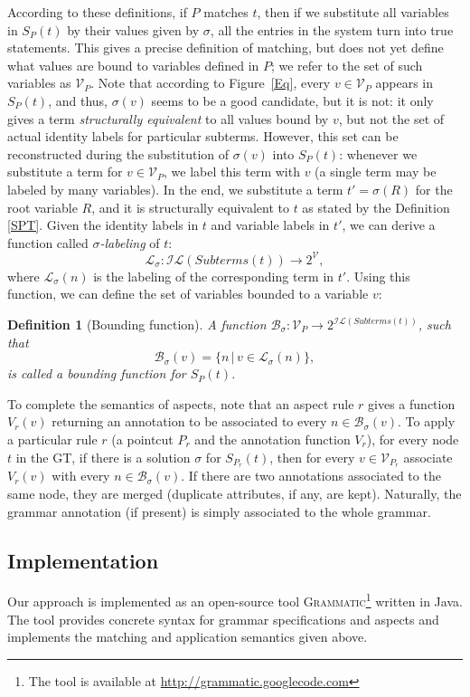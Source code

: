 \documentclass{IOS-Book-Article}     %
\newtheorem{Def}{Definition}
\newcommand{\figref}[1]{Figure~\ref{#1}}
\newcommand{\tool}[1]{\textsc{#1}}
\newcommand{\Grammatic}[0]{\tool{Grammatic}}
\begin{document}
According to these definitions, if $P$ matches $t$, then if we substitute all variables in $S_P(t)$ by their values given by $\sigma$, all the entries in the system turn into true statements. This gives a precise definition of matching, but does not yet define what values are bound to variables defined in $P$; we refer to the set of such variables as $\mathcal{V}_P$. Note that according to \figref{Eq}, every $v \in \mathcal{V}_P$ appears in $S_P(t)$, and thus, $\sigma(v)$ seems to be a good candidate, but it is not: it only gives a term \emph{structurally equivalent} to all values bound by $v$, but not the set of actual identity labels for particular subterms. However, this set can be reconstructed during the substitution of $\sigma(v)$ into $S_P(t)$: whenever we substitute a term for $v \in \mathcal{V}_P$, we label this term with $v$ (a single term may be labeled by many variables). In the end, we substitute a term $t' = \sigma(R)$ for the root variable $R$, and it is structurally equivalent to $t$ as stated by the Definition \ref{SPT}. Given the identity labels in $t$ and variable labels in $t'$, we can derive a function called \emph{$\sigma$-labeling} of $t$:
$$\mathcal{L}_\sigma : \mathcal{IL}(Subterms(t)) \rightarrow 2^{\mathcal{V}},$$
where $\mathcal{L}_\sigma(n)$ is the labeling of the corresponding term in $t'$. Using this function, we can define the set of variables bounded to a variable $v$:
\begin{Def}[Bounding function]
A function $\mathcal{B}_\sigma : \mathcal{V}_P \rightarrow 2^{\mathcal{IL}(Subterms(t))}$, such that $$\mathcal{B}_\sigma(v) = \{n \,|\, v \in \mathcal{L}_\sigma(n)\},$$
is called a \emph{bounding function} for $S_P(t)$.
\end{Def}

To complete the semantics of aspects, note that an aspect rule $r$ gives a function $V_r(v)$ returning an annotation to be associated to every $n \in \mathcal{B}_\sigma(v)$. To apply a particular rule $r$ (a pointcut $P_r$ and the annotation function $V_r$), for every node $t$ in the GT, if there is a solution $\sigma$ for $S_{P_r}(t)$, then for every $v \in \mathcal{V}_{P_r}$ associate $V_r(v)$ with every $n \in \mathcal{B}_\sigma(v)$. If there are two annotations associated to the same node, they are merged (duplicate attributes, if any, are kept). Naturally, the grammar annotation (if present) is simply associated to the whole grammar.

\subsection{Implementation}
Our approach is implemented as an open-source tool \Grammatic{}\footnote{The tool is available at \url{http://grammatic.googlecode.com}} written in Java. The tool provides concrete syntax for grammar specifications and aspects and implements the matching and application semantics given above. 
\end{document}
